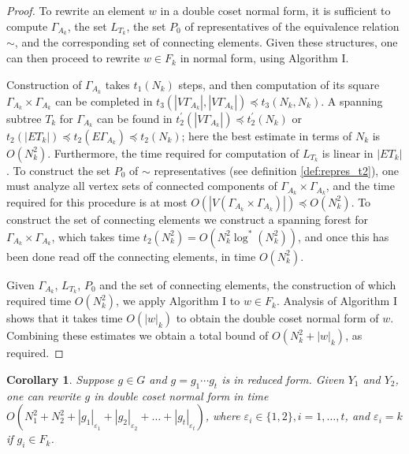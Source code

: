 \documentclass[a4paper,12pt]{article}
\newcommand{\G}{\Gamma }
\newcommand{\e}{\varepsilon }
\newtheorem{corollary}[theorem]{Corollary}
\numberwithin{equation}{section}
\numberwithin{figure}{section}
\begin{document}
\begin{proof}
To rewrite an element $w$ in a double coset normal form, it is
sufficient to compute $\G_{A_k}$, the set $L_{T_k}$,
the set $P_0$  of
 representatives of the equivalence relation $\sim$, and the
corresponding  set of connecting elements.
 Given these structures, one can then proceed to rewrite $w \in
F_k$ in normal form, using Algorithm I.

Construction of $\G_{A_k}$ takes  $t_1(N_k)$ steps, and then
computation of its square
 $\G_{A_k} \times \G_{A_k}$ can be completed in
 $t_3(|V\G_{A_k}|,|V\G_{A_k}|) \preceq t_3(N_k,N_k)$.
A spanning subtree $T_k$ for $\G_{A_k}$ can be found in
$t^{\prime}_2(|V\G_{A_k}|) \preceq t^{\prime}_2(N_k)$ or $t_2(|E
T_k|) \preceq t_2(E\G_{A_k}) \preceq t_2(N_k)$; here the best
estimate in terms of $N_k$ is $O(N_k^2)$. Furthermore, the time
required for computation of $L_{T_k}$ is linear in $|E T_k|$.
To construct the set $P_0$ of $\sim$
representatives (see definition \ref{def:repres_t2}), one must
analyze all vertex sets of connected components of $\G_{A_k}
\times \G_{A_k}$, and the time  required for this procedure is at
most $O(|V(\G_{A_k} \times \G_{A_k})|) \preceq O(N^2_k)$. To construct
the set of connecting elements we construct a spanning forest for
$\G_{A_k} \times \G_{A_k}$, which takes time $t_2(N_k^2)
=O(N_k^2\log^*(N_k^2))$, and once this
has been done read off the connecting elements, in time $O(N^2_k)$.


Given $\G_{A_k}$, $L_{T_k}$, $P_0$ and the set of connecting elements,
the construction of which required time
 $O(N^2_k)$,
 we apply Algorithm I to $w \in F_k$. Analysis
of Algorithm I shows that it takes time  $O(|w|_k)$  to obtain
the double coset normal form of $w$. Combining these estimates
 we obtain a total bound of $O(N^2_k + |w|_k)$, as required.
\end{proof}

\begin{corollary}\label{cor:dcnf_time} Suppose $g \in G$ and $g=g_1 \cdots g_t$ is in reduced
form. Given $Y_1$ and $Y_2$, one can rewrite $g$ in double coset normal
form in time  $O(N^2_1+ N^2_2 + |g_1|_{\e_1}+|g_2|_{\e_2}+
\ldots +|g_t|_{\e_t})$, where $\e_i \in \{ 1, 2\}, i = 1, \ldots,
t$, and $\e_i = k$ if $g_i \in F_k$.
\end{corollary}
\end{document}
